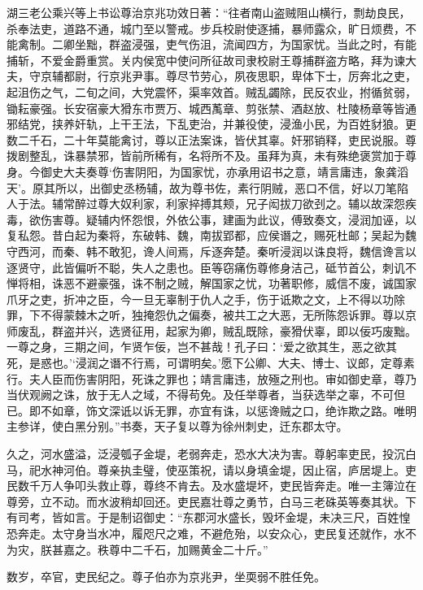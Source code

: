\documentclass[12pt,UTF8]{ctexbook}
\begin{document}
湖三老公乘兴等上书讼尊治京兆功效日著：“往者南山盗贼阻山横行，剽劫良民，杀奉法吏，道路不通，城门至以警戒。步兵校尉使逐捕，暴师露众，旷日烦费，不能禽制。二卿坐黜，群盗浸强，吏气伤沮，流闻四方，为国家忧。当此之时，有能捕斩，不爱金爵重赏。关内侯宽中使问所征故司隶校尉王尊捕群盗方略，拜为谏大夫，守京辅都尉，行京兆尹事。尊尽节劳心，夙夜思职，卑体下士，厉奔北之吏，起沮伤之气，二旬之间，大党震怀，渠率效首。贼乱蠲除，民反农业，拊循贫弱，锄耘豪强。长安宿豪大猾东市贾万、城西萭章、剪张禁、酒赵放、杜陵杨章等皆通邪结党，挟养奸轨，上干王法，下乱吏治，并兼役使，浸渔小民，为百姓豺狼。更数二千石，二十年莫能禽讨，尊以正法案诛，皆伏其辜。奸邪销释，吏民说服。尊拨剧整乱，诛暴禁邪，皆前所稀有，名将所不及。虽拜为真，未有殊绝褒赏加于尊身。今御史大夫奏尊‘伤害阴阳，为国家忧，亦承用诏书之意，靖言庸违，象龚滔天’。原其所以，出御史丞杨辅，故为尊书佐，素行阴贼，恶口不信，好以刀笔陷人于法。辅常醉过尊大奴利家，利家捽搏其颊，兄子闳拔刀欲刭之。辅以故深怨疾毒，欲伤害尊。疑辅内怀怨恨，外依公事，建画为此议，傅致奏文，浸润加诬，以复私怨。昔白起为秦将，东破韩、魏，南拔郢都，应侯谮之，赐死杜邮；吴起为魏守西河，而秦、韩不敢犯，谗人间焉，斥逐奔楚。秦听浸润以诛良将，魏信谗言以逐贤守，此皆偏听不聪，失人之患也。臣等窃痛伤尊修身洁己，砥节首公，刺讥不惮将相，诛恶不避豪强，诛不制之贼，解国家之忧，功著职修，威信不废，诚国家爪牙之吏，折冲之臣，今一旦无辜制于仇人之手，伤于诋欺之文，上不得以功除罪，下不得蒙棘木之听，独掩怨仇之偏奏，被共工之大恶，无所陈怨诉罪。尊以京师废乱，群盗并兴，选贤征用，起家为卿，贼乱既除，豪猾伏辜，即以佞巧废黜。一尊之身，三期之间，乍贤乍佞，岂不甚哉！孔子曰：‘爱之欲其生，恶之欲其死，是惑也。’‘浸润之谮不行焉，可谓明矣。’愿下公卿、大夫、博士、议郎，定尊素行。夫人臣而伤害阴阳，死诛之罪也；靖言庸违，放殛之刑也。审如御史章，尊乃当伏观阙之诛，放于无人之域，不得苟免。及任举尊者，当获选举之辜，不可但已。即不如章，饰文深诋以诉无罪，亦宜有诛，以惩谗贼之口，绝诈欺之路。唯明主参详，使白黑分别。”书奏，天子复以尊为徐州刺史，迁东郡太守。



久之，河水盛溢，泛浸瓠子金堤，老弱奔走，恐水大决为害。尊躬率吏民，投沉白马，祀水神河伯。尊亲执圭璧，使巫策祝，请以身填金堤，因止宿，庐居堤上。吏民数千万人争叩头救止尊，尊终不肯去。及水盛堤坏，吏民皆奔走。唯一主簿泣在尊旁，立不动。而水波稍却回还。吏民嘉壮尊之勇节，白马三老硃英等奏其状。下有司考，皆如言。于是制诏御史：“东郡河水盛长，毁坏金堤，未决三尺，百姓惶恐奔走。太守身当水冲，履咫尺之难，不避危殆，以安众心，吏民复还就作，水不为灾，朕甚嘉之。秩尊中二千石，加赐黄金二十斤。”



数岁，卒官，吏民纪之。尊子伯亦为京兆尹，坐耎弱不胜任免。
\end{document}

